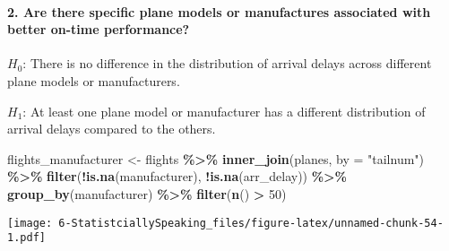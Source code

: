 \documentclass[
]{article}
\newenvironment{Shaded}{\begin{snugshade}}{\end{snugshade}}
\newcommand{\AttributeTok}[1]{\textcolor[rgb]{0.13,0.29,0.53}{#1}}
\newcommand{\DecValTok}[1]{\textcolor[rgb]{0.00,0.00,0.81}{#1}}
\newcommand{\FunctionTok}[1]{\textcolor[rgb]{0.13,0.29,0.53}{\textbf{#1}}}
\newcommand{\NormalTok}[1]{#1}
\newcommand{\OtherTok}[1]{\textcolor[rgb]{0.56,0.35,0.01}{#1}}
\newcommand{\SpecialCharTok}[1]{\textcolor[rgb]{0.81,0.36,0.00}{\textbf{#1}}}
\newcommand{\StringTok}[1]{\textcolor[rgb]{0.31,0.60,0.02}{#1}}
\begin{document}
\newpage

\paragraph{2. Are there specific plane models or manufactures associated
with better on-time
performance?~}\label{are-there-specific-plane-models-or-manufactures-associated-with-better-on-time-performance}

\(H_0\): There is no difference in the distribution of arrival delays
across different plane models or manufacturers.

\(H_1\): At least one plane model or manufacturer has a different
distribution of arrival delays compared to the others.

\begin{Shaded}
\begin{Highlighting}[]
\NormalTok{flights\_manufacturer }\OtherTok{\textless{}{-}}\NormalTok{ flights }\SpecialCharTok{\%\textgreater{}\%}
  \FunctionTok{inner\_join}\NormalTok{(planes, }\AttributeTok{by =} \StringTok{"tailnum"}\NormalTok{) }\SpecialCharTok{\%\textgreater{}\%}
  \FunctionTok{filter}\NormalTok{(}\SpecialCharTok{!}\FunctionTok{is.na}\NormalTok{(manufacturer), }\SpecialCharTok{!}\FunctionTok{is.na}\NormalTok{(arr\_delay)) }\SpecialCharTok{\%\textgreater{}\%}
  \FunctionTok{group\_by}\NormalTok{(manufacturer) }\SpecialCharTok{\%\textgreater{}\%}
  \FunctionTok{filter}\NormalTok{(}\FunctionTok{n}\NormalTok{() }\SpecialCharTok{\textgreater{}} \DecValTok{50}\NormalTok{)}
\end{Highlighting}
\end{Shaded}

\texttt{[image: 6-StatistciallySpeaking\_files/figure-latex/unnamed-chunk-54-1.pdf]}
\end{document}
